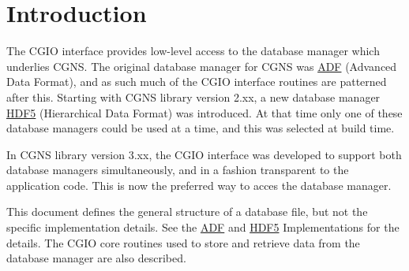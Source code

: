 \section{Introduction}
\label{s:intro}
\thispagestyle{plain}

The CGIO interface provides low-level access to the database manager which
underlies CGNS. The original database manager for CGNS was
\href{../adf/adf.pdf}{ADF} (Advanced Data Format), and as such
much of the CGIO interface routines are patterned after this. Starting
with CGNS library version 2.xx, a new database manager
\href{../hdf5/hdf5.pdf}{HDF5} (Hierarchical Data Format) was
introduced. At that time only one of these database managers could be used
at a time, and this was selected at build time.

In CGNS library version 3.xx, the CGIO interface was developed to support
both database managers simultaneously, and in a fashion transparent to
the application code. This is now the preferred way to acces the database
manager.

This document defines the general structure of a database file, but not
the specific implementation details. See the
\href{../adf/adf.pdf}{ADF} and \href{../hdf5/hdf5.pdf}{HDF5}
Implementations for the details.
The CGIO core routines used to store and retrieve data from the
database manager are also described.

